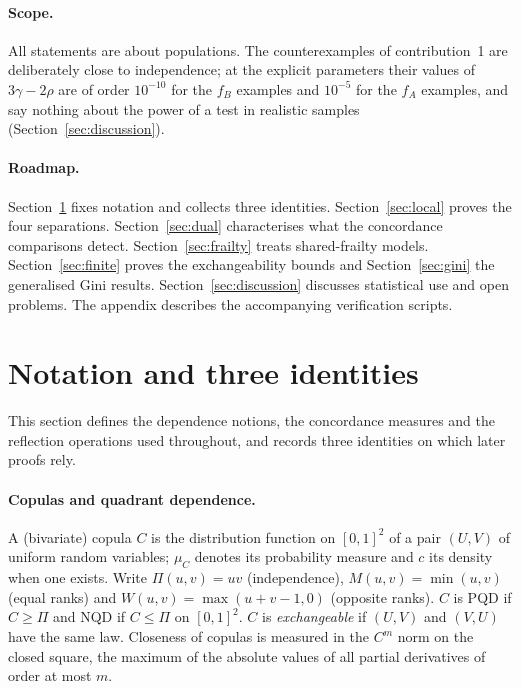 \documentclass[11pt,a4paper]{article}
\theoremstyle{remark}
\begin{document}
\paragraph{Scope.} All statements are about populations. The counterexamples of contribution~1 are deliberately close to independence; at the explicit parameters their values of $3\gamma-2\rho$ are of order $10^{-10}$ for the $f_B$ examples and $10^{-5}$ for the $f_A$ examples, and say nothing about the power of a test in realistic samples (Section~\ref{sec:discussion}).

\paragraph{Roadmap.} Section~\ref{sec:prelim} fixes notation and collects three identities. Section~\ref{sec:local} proves the four separations. Section~\ref{sec:dual} characterises what the concordance comparisons detect. Section~\ref{sec:frailty} treats shared-frailty models. Section~\ref{sec:finite} proves the exchangeability bounds and Section~\ref{sec:gini} the generalised Gini results. Section~\ref{sec:discussion} discusses statistical use and open problems. The appendix describes the accompanying verification scripts.

\section{Notation and three identities}\label{sec:prelim}
This section defines the dependence notions, the concordance measures and the reflection operations used throughout, and records three identities on which later proofs rely.

\paragraph{Copulas and quadrant dependence.} A (bivariate) copula $C$ is the distribution function on $[0,1]^2$ of a pair $(U,V)$ of uniform random variables; $\mu_C$ denotes its probability measure and $c$ its density when one exists. Write $\Pi(u,v)=uv$ (independence), $M(u,v)=\min(u,v)$ (equal ranks) and $W(u,v)=\max(u+v-1,0)$ (opposite ranks). $C$ is PQD if $C\geq\Pi$ and NQD if $C\leq\Pi$ on $[0,1]^2$. $C$ is \emph{exchangeable} if $(U,V)$ and $(V,U)$ have the same law. Closeness of copulas is measured in the $C^m$ norm on the closed square, the maximum of the absolute values of all partial derivatives of order at most $m$.
\end{document}

